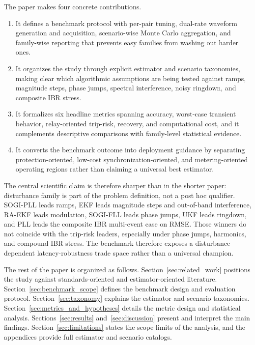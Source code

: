 The paper makes four concrete contributions.
\begin{enumerate}[leftmargin=1.8em]
\item It defines a benchmark protocol with per-pair tuning, dual-rate waveform generation and acquisition, scenario-wise Monte Carlo aggregation, and family-wise reporting that prevents easy families from washing out harder ones.
\item It organizes the study through explicit estimator and scenario taxonomies, making clear which algorithmic assumptions are being tested against ramps, magnitude steps, phase jumps, spectral interference, noisy ringdown, and composite IBR stress.
\item It formalizes six headline metrics spanning accuracy, worst-case transient behavior, relay-oriented trip-risk, recovery, and computational cost, and it complements descriptive comparisons with family-level statistical evidence.
\item It converts the benchmark outcome into deployment guidance by separating protection-oriented, low-cost synchronization-oriented, and metering-oriented operating regions rather than claiming a universal best estimator.
\end{enumerate}

The central scientific claim is therefore sharper than in the shorter paper: disturbance family is part of the problem definition, not a post hoc qualifier. SOGI-PLL leads ramps, EKF leads magnitude steps and out-of-band interference, RA-EKF leads modulation, SOGI-FLL leads phase jumps, UKF leads ringdown, and PLL leads the composite IBR multi-event case on RMSE. Those winners do not coincide with the trip-risk leaders, especially under phase jumps, harmonics, and compound IBR stress. The benchmark therefore exposes a disturbance-dependent latency-robustness trade space rather than a universal champion.

The rest of the paper is organized as follows. Section~\ref{sec:related_work} positions the study against standards-oriented and estimator-oriented literature. Section~\ref{sec:benchmark_scope} defines the benchmark design and evaluation protocol. Section~\ref{sec:taxonomy} explains the estimator and scenario taxonomies. Section~\ref{sec:metrics_and_hypotheses} details the metric design and statistical analysis. Sections~\ref{sec:results} and~\ref{sec:discussion} present and interpret the main findings. Section~\ref{sec:limitations} states the scope limits of the analysis, and the appendices provide full estimator and scenario catalogs.
